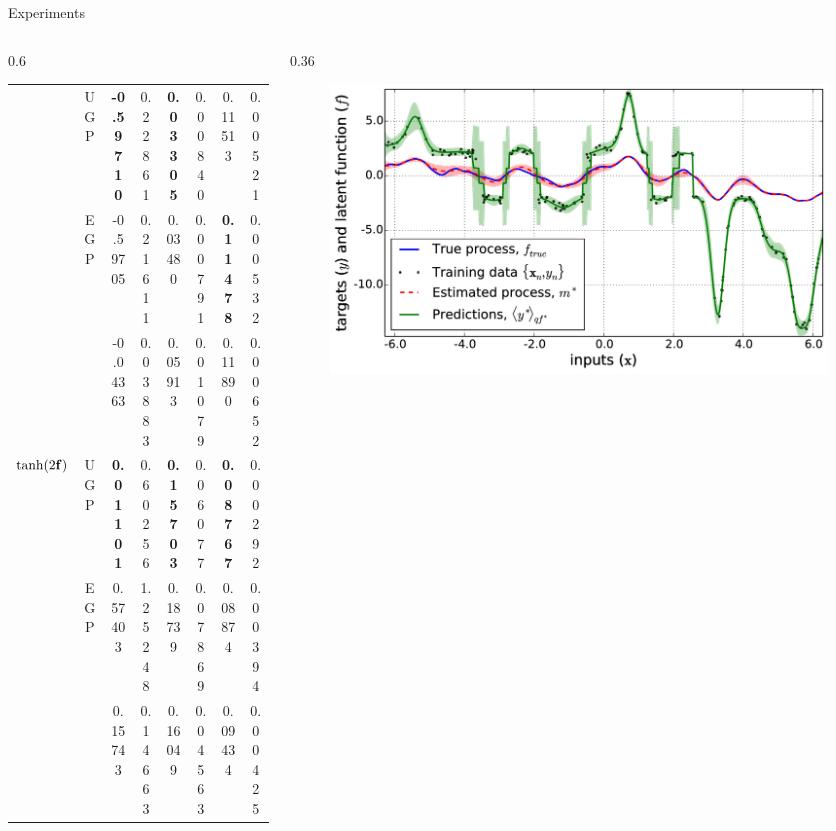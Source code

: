 \documentclass[final]{beamer}
\newlength{\onecolwid}
\newlength{\twocolwid}
\begin{document}
\begin{frame}[t]
\begin{columns}[t]
\begin{column}{\twocolwid}
\begin{columns}[t,totalwidth=\twocolwid]
\begin{column}{\twocolwid}
\begin{block}{Experiments}
\begin{columns}
\begin{column}{0.6\twocolwid}
\begin{table}[tb]
\begin{tabular}{r|c| c c c c c c}
& UGP & \textbf{-0.59710} & 0.22861 & \textbf{0.03305} & 0.00840 & 0.11513 & 0.00521 \\
& EGP & -0.59705 & 0.21611 & 0.03480 & 0.00791 & \textbf{0.11478} & 0.00532 \\
& \cite{Opper2009} & -0.04363 & 0.03883 & 0.05913 & 0.01079 & 0.11890 & 0.00652 \\
        \midrule
        $\tanh\!\left({2\mathbf{f}}\right)$
& UGP & \textbf{0.01101} & 0.60256 & \textbf{0.15703} & 0.06077 & \textbf{0.08767} & 0.00292 \\
& EGP & 0.57403 & 1.25248 & 0.18739 & 0.07869 & 0.08874 & 0.00394 \\
& \cite{Opper2009} & 0.15743 & 0.14663 & 0.16049 & 0.04563 & 0.09434 & 0.00425 \\
        \bottomrule
    \end{tabular}
    \label{tab:toy}
\end{table}




\end{column}

\begin{column}{0.36\twocolwid}
\begin{figure}
    \includegraphics[width=0.6\onecolwid]{fig/signdemo.png}


\end{figure}
\end{column}
\end{columns}
\end{block}
\end{column}
\end{columns}
\end{column}
\end{columns}
\end{frame}
\end{document}
